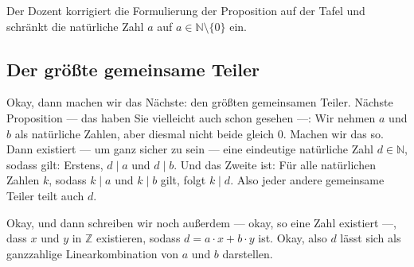 \begin{meta-note}
Der Dozent korrigiert die Formulierung der Proposition auf der Tafel und schränkt die natürliche Zahl $a$ auf $a \in \mathbb{N} \setminus \{0\}$ ein.
\end{meta-note}

\subsection{Der größte gemeinsame Teiler}

\begin{spoken-clean}[00:13:37 - 00:17:09]
Okay, dann machen wir das Nächste: den größten gemeinsamen Teiler. Nächste Proposition --- das haben Sie vielleicht auch schon gesehen ---: Wir nehmen $a$ und $b$ als natürliche Zahlen, aber diesmal nicht beide gleich $0$. Machen wir das so. Dann existiert --- um ganz sicher zu sein --- eine eindeutige natürliche Zahl $d \in \mathbb{N}$, sodass gilt: Erstens, $d \mid a$ und $d \mid b$. Und das Zweite ist: Für alle natürlichen Zahlen $k$, sodass $k \mid a$ und $k \mid b$ gilt, folgt $k \mid d$. Also jeder andere gemeinsame Teiler teilt auch $d$.

Okay, und dann schreiben wir noch außerdem --- okay, so eine Zahl existiert ---, dass $x$ und $y$ in $\mathbb{Z}$ existieren, sodass $d = a \cdot x + b \cdot y$ ist. Okay, also $d$ lässt sich als ganzzahlige Linearkombination von $a$ und $b$ darstellen.
\end{spoken-clean}

\begin{math-stroke}

\end{math-stroke}

